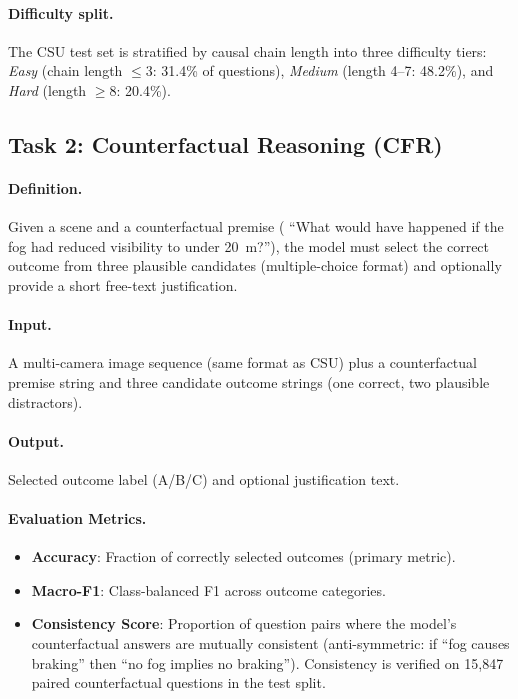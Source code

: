 \paragraph{Difficulty split.}
The CSU test set is stratified by causal chain length into three difficulty tiers:
\textit{Easy} (chain length $\le 3$: 31.4\% of questions), \textit{Medium} (length 4--7:
48.2\%), and \textit{Hard} (length $\ge 8$: 20.4\%).

\subsection{Task 2: Counterfactual Reasoning (CFR)}
\label{ssec:task_cfr}

\paragraph{Definition.}
Given a scene and a counterfactual premise (\eg{} ``What would have happened if the
fog had reduced visibility to under 20~m?''), the model must select the correct
outcome from three plausible candidates (multiple-choice format) and optionally
provide a short free-text justification.

\paragraph{Input.}
A multi-camera image sequence (same format as CSU) plus a counterfactual premise
string and three candidate outcome strings (one correct, two plausible distractors).

\paragraph{Output.}
Selected outcome label (A/B/C) and optional justification text.

\paragraph{Evaluation Metrics.}
\begin{itemize}[leftmargin=2em, noitemsep]
  \item \textbf{Accuracy}: Fraction of correctly selected outcomes (primary metric).
  \item \textbf{Macro-F1}: Class-balanced F1 across outcome categories.
  \item \textbf{Consistency Score}: Proportion of question pairs where the model's
        counterfactual answers are mutually consistent (anti-symmetric: if ``fog causes
        braking'' then ``no fog implies no braking''). Consistency is verified on 15,847
        paired counterfactual questions in the test split.
\end{itemize}

